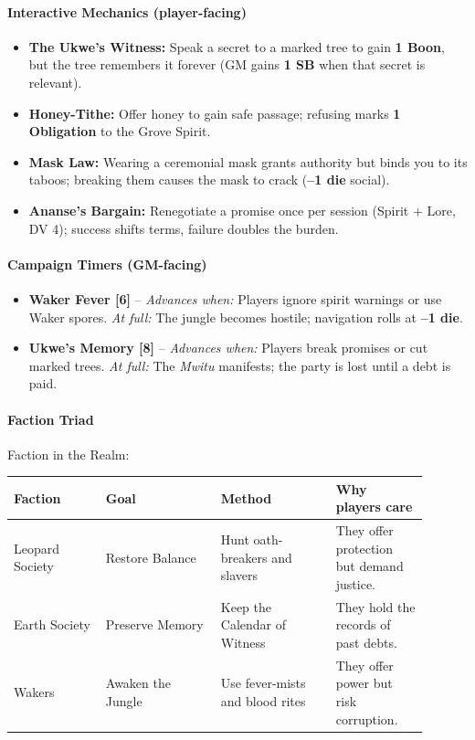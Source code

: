 \paragraph{Interactive Mechanics (player-facing)}
\begin{itemize}
\item[\card{\spadesuit}{1}] \textbf{The Ukwe's Witness:} Speak a secret to a marked tree to gain \textbf{1 Boon}, but the tree remembers it forever (GM gains \textbf{1 SB} when that secret is relevant).
\item[\card{\heartsuit}{2}] \textbf{Honey-Tithe:} Offer honey to gain safe passage; refusing marks \textbf{1 Obligation} to the Grove Spirit.
\item[\card{\clubsuit}{3}] \textbf{Mask Law:} Wearing a ceremonial mask grants authority but binds you to its taboos; breaking them causes the mask to crack (\textbf{--1 die} social).
\item[\card{\diamondsuit}{4}] \textbf{Ananse's Bargain:} Renegotiate a promise once per session (Spirit + Lore, DV 4); success shifts terms, failure doubles the burden.
\end{itemize}

\paragraph{Campaign Timers (GM-facing)}
\begin{itemize}
\item \textbf{Waker Fever [6]} -- \textit{Advances when:} Players ignore spirit warnings or use Waker spores. \textit{At full:} The jungle becomes hostile; navigation rolls at \textbf{--1 die}.
\item \textbf{Ukwe's Memory [8]} -- \textit{Advances when:} Players break promises or cut marked trees. \textit{At full:} The \textit{Mwitu} manifests; the party is lost until a debt is paid.
\end{itemize}

\paragraph{Faction Triad}
Faction in the Realm:
\begin{tabular}{|p{0.2\linewidth}|p{0.25\linewidth}|p{0.25\linewidth}|p{0.2\linewidth}|}
\hline
\textbf{Faction} & \textbf{Goal} & \textbf{Method} & \textbf{Why players care} \\
\hline
Leopard Society & Restore Balance & Hunt oath-breakers and slavers & They offer protection but demand justice. \\
\hline
Earth Society & Preserve Memory & Keep the Calendar of Witness & They hold the records of past debts. \\
\hline
Wakers & Awaken the Jungle & Use fever-mists and blood rites & They offer power but risk corruption. \\
\hline
\end{tabular}

